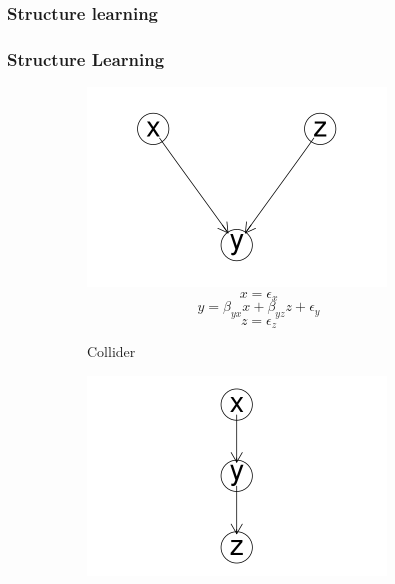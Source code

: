 \documentclass{beamer}
\begin{document}
\subsubsection{Structure learning}
\begin{frame}
    \frametitle{Structure Learning}
    \begin{figure}
        \centering
        \begin{subfigure}{0.3\textwidth}
          \centering
          \includegraphics[width=\linewidth]{images/collider.png} 
          \small
          \begin{equation*}
            x = \epsilon_{x}
          \end{equation*}
          \begin{equation*}
            y = \beta_{yx} x + \beta_{yz} z + \epsilon_{y}
          \end{equation*}
          \begin{equation*}
            z = \epsilon_{z}
          \end{equation*}
          \caption{Collider}
          \label{collider}
        \end{subfigure}
        \begin{subfigure}{0.3\textwidth}
          \includegraphics[width=\linewidth]{images/chain.png}

\end{subfigure}
\end{figure}
\end{frame}
\end{document}

